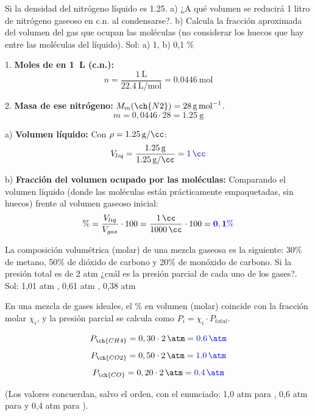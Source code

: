 \begin{exercise}
    Si la densidad del nitrógeno líquido es \qty{1.25}{\gpcc}. a) ¿A qué volumen se reducirá 1 litro de nitrógeno gaseoso en c.n. al condensarse?. b) Calcula la fracción aproximada del volumen del gas que ocupan las moléculas (no considerar los huecos que hay entre las moléculas del líquido).
    Sol: a) \qty{1}{\cc},  b)  0,1 \%

    \begin{solu}
        1. \textbf{Moles de  en \qty{1}{\L} (c.n.):}
        \[ n = \dfrac{\qty{1}{\L}}{\qty{22.4}{\L\per\mol}} = \qty{0.0446}{\mol} \]

        2. \textbf{Masa de ese nitrógeno:} $M_m(\ch{N2}) = \qty{28}{\g\per\mol}$.
        \[ m = 0,0446 \cdot 28 = \qty{1.25}{\g} \]

        a) \textbf{Volumen líquido:} Con $\rho = \qty{1.25}{\g\per\cc}$:
        \[ V_{liq} = \dfrac{\qty{1.25}{\g}}{\qty{1.25}{\g\per\cc}} = \mathbf{\textcolor{blue}{\qty{1}{\cc}}} \]

        b) \textbf{Fracción del volumen ocupado por las moléculas:} Comparando el volumen líquido (donde las moléculas están prácticamente empaquetadas, sin huecos) frente al volumen gaseoso inicial:
        \[ \% = \dfrac{V_{liq}}{V_{gas}} \cdot 100 = \dfrac{\qty{1}{\cc}}{\qty{1000}{\cc}} \cdot 100 = \mathbf{\textcolor{blue}{0,1 \%}} \]
    \end{solu}
\end{exercise}

\begin{exercise}
    La composición volumétrica (molar) de una mezcla gaseosa es la siguiente: 30\% de metano, 50\% de dióxido de carbono y 20\% de monóxido de carbono. Si la presión total es de 2 atm ¿cuál es la presión parcial de cada uno de los gases?.
    Sol: 1,01 atm , 0,61 atm , 0,38 atm

    \begin{solu}
        En una mezcla de gases ideales, el \% en volumen (molar) coincide con la fracción molar $\chi_i$, y la presión parcial se calcula como $P_i = \chi_i \cdot P_{total}$.

        \[ P_{\ch{CH4}} = 0,30 \cdot \qty{2}{\atm} = \mathbf{\textcolor{blue}{\qty{0,6}{\atm}}} \]
        \[ P_{\ch{CO2}} = 0,50 \cdot \qty{2}{\atm} = \mathbf{\textcolor{blue}{\qty{1,0}{\atm}}} \]
        \[ P_{\ch{CO}} = 0,20 \cdot \qty{2}{\atm} = \mathbf{\textcolor{blue}{\qty{0,4}{\atm}}} \]

        (Los valores concuerdan, salvo el orden, con el enunciado: 1,0 atm para , 0,6 atm para  y 0,4 atm para ).
    \end{solu}
\end{exercise}

